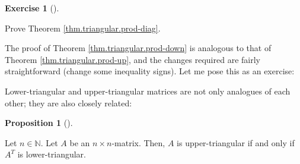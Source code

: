 \documentclass[numbers=enddot,12pt,final,onecolumn,notitlepage]{scrartcl}%
\theoremstyle{definition}
\newtheorem{prop}[theo]{Proposition}
\newenvironment{proposition}[1][]
{\begin{prop}[#1]\begin{leftbar}}
{\end{leftbar}\end{prop}}
\newtheorem{exmp}[theo]{Exercise}
\newenvironment{exercise}[1][]
{\begin{exmp}[#1]\begin{leftbar}}
{\end{leftbar}\end{exmp}}
\begin{document}
\begin{exercise}
\label{exe.thm.triangular.prod-diag}Prove Theorem
\ref{thm.triangular.prod-diag}.
\end{exercise}

The proof of Theorem \ref{thm.triangular.prod-down} is analogous to that of
Theorem \ref{thm.triangular.prod-up}, and the changes required are fairly
straightforward (change some inequality signs). Let me pose this as an exercise:

Lower-triangular and upper-triangular matrices are not only analogues of each
other; they are also closely related:

\begin{proposition}
\label{prop.triangular.UT=D}Let $n\in\mathbb{N}$. Let $A$ be an $n\times
n$-matrix. Then, $A$ is upper-triangular if and only if $A^{T}$ is lower-triangular.
\end{proposition}
\end{document}
